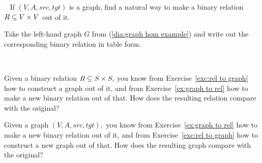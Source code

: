 \documentclass[../main/CT4S-EN-RU]{subfiles}
\begin{document}
\begin{exerciseRUS}\label{exc:rel to graph}
\end{exerciseRUS}

\begin{exerciseENG}\label{ex:graph to rel}~
\sexc If $(V,A,src,tgt)$ is a graph, find a natural way to make a binary relation $R\ss V\times V$ out of it. 
\item Take the left-hand graph $G$ from (\ref{dia:graph hom example}) and write out the corresponding binary relation in table form.
\endsexc
\end{exerciseENG}

\begin{exerciseRUS}\label{ex:graph to rel}~
\end{exerciseRUS}

\begin{exerciseENG}
\sexc Given a binary relation $R\ss S\times S,$ you know from Exercise~\ref{exc:rel to graph} how to construct a graph out of it, and from Exercise~\ref{ex:graph to rel} how to make a new binary relation out of that. How does the resulting relation compare with the original?
\item Given a graph $(V,A,src,tgt),$ you know from Exercise~\ref{ex:graph to rel} how to make a new binary relation out of it, and from Exercise~\ref{exc:rel to graph} how to construct a new graph out of that. How does the resulting graph compare with the original? 
\endsexc
\end{exerciseENG}

\begin{exerciseRUS}
\end{exerciseRUS}
\end{document}
